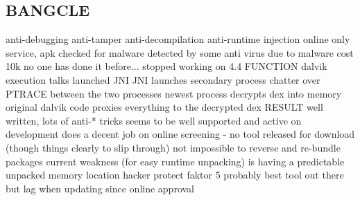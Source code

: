 \subsection{BANGCLE}
anti-debugging\newline
anti-tamper\newline
anti-decompilation\newline
anti-runtime injection\newline
online only service, apk checked for malware\newline
detected by some anti virus due to malware\newline
cost 10k\newline
no one has done it before...\newline
stopped working on 4.4\newline
FUNCTION\newline
dalvik execution talks launched JNI\newline
JNI launches secondary process\newline
chatter over PTRACE between the two processes\newline
newest process decrypts dex into memory\newline
original dalvik code proxies everything to the decrypted dex\newline
RESULT\newline
well written, lots of anti-* tricks\newline
seems to be well supported and active on development\newline
does a decent job on online screening - no tool released for download (though things clearly to slip through)\newline
not impossible to reverse and re-bundle packages\newline
current weakness (for easy runtime unpacking) is having a predictable unpacked memory location\newline
hacker protect faktor 5\newline
probably best tool out there but lag when updating since online approval\newline
